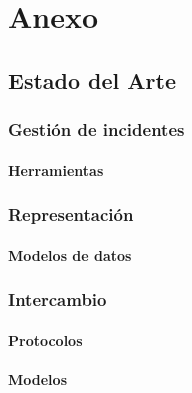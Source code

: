 \chapter{Anexo}
\label{anexo}

\section{Estado del Arte}
\label{anexo.estadodelarte}

\subsection{Gestión de incidentes}
\label{anexo.gestiondeincidentes}
\subsubsection{Herramientas}
\label{anexo.herramientas}


\subsection{Representación}
\label{anexo.representacion}
\subsubsection{Modelos de datos}
\label{anexo.modelodedatos}



%


\subsection{Intercambio}
\label{anexo.intercambio}
\subsubsection{Protocolos}
\label{anexo.protocolos}
 
 
\subsubsection{Modelos}
\label{anexo.modelos}
 

